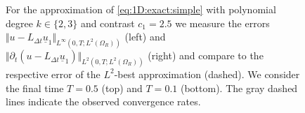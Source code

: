 \documentclass[sn-mathphys-num]{sn-jnl}
\numberwithin{equation}{section}
\newcommand{\ul}{\underline{u}}
\begin{document}
\begin{figure}[!htbp]
\begin{center}
    \end{center}
    \caption{For the approximation of \eqref{eq:1D:exact:simple} with polynomial degree $k \in \{2,3\}$ and contrast $c_1 = 2.5$ we measure the errors $\Vert u-L_{\Delta t} \ul_1 \Vert_{L^\infty(0,T;L^2(\Omega_R))}$ (left) and $\Vert \partial_t (u-L_{\Delta t} \ul_1) \Vert_{L^2(0,T;L^2(\Omega_R))}$ (right) and compare to the respective error of the $L^2$-best approximation (dashed). We consider the final time $T = 0.5$ (top) and $T = 0.1$ (bottom). The gray dashed lines indicate the observed convergence rates.}
    \label{fig:jumpCoefs:contrast:2.5}
  \end{figure}
\end{document}

